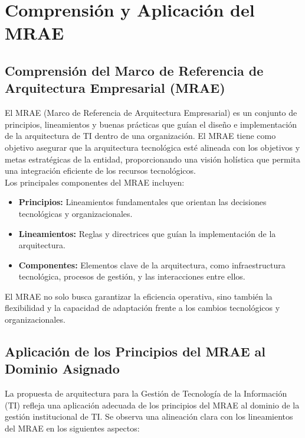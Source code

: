 \section{Comprensión y Aplicación del MRAE}
\subsection{Comprensión del Marco de Referencia de Arquitectura Empresarial (MRAE)}

El MRAE (Marco de Referencia de Arquitectura Empresarial) es un conjunto de principios, lineamientos y buenas prácticas que guían el diseño e implementación de la arquitectura de TI dentro de una organización. El MRAE tiene como objetivo asegurar que la arquitectura tecnológica esté alineada con los objetivos y metas estratégicas de la entidad, proporcionando una visión holística que permita una integración eficiente de los recursos tecnológicos.\\

Los principales componentes del MRAE incluyen:

\begin{itemize}
    \item \textbf{Principios: }Lineamientos fundamentales que orientan las decisiones tecnológicas y organizacionales.
    \item \textbf{Lineamientos: }Reglas y directrices que guían la implementación de la arquitectura.
    \item \textbf{Componentes: }Elementos clave de la arquitectura, como infraestructura tecnológica, procesos de gestión, y las interacciones entre ellos.
\end{itemize}

El MRAE no solo busca garantizar la eficiencia operativa, sino también la flexibilidad y la capacidad de adaptación frente a los cambios tecnológicos y organizacionales.

\subsection{Aplicación de los Principios del MRAE al Dominio Asignado }
La propuesta de arquitectura para la Gestión de Tecnología de la Información (TI) refleja una aplicación adecuada de los principios del MRAE al dominio de la gestión institucional de TI. Se observa una alineación clara con los lineamientos del MRAE en los siguientes aspectos:

